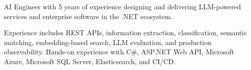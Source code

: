 

\begin{cvparagraph}

AI Engineer with 5 years of experience designing and delivering LLM-powered services and enterprise software in the .NET ecosystem.

Experience includes REST APIs, information extraction, classification, semantic matching, embedding-based search, LLM evaluation, and production observability.
Hands-on experience with C\#, ASP.NET Web API, Microsoft Azure, Microsoft SQL Server, Elasticsearch, and CI/CD.
\end{cvparagraph}
